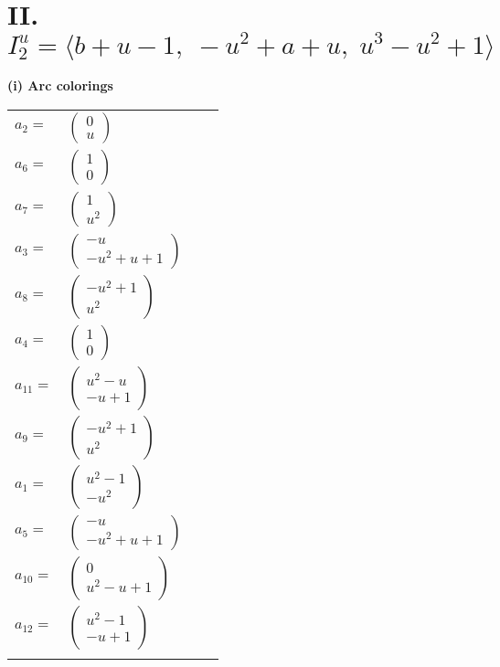 \documentclass[1p]{elsarticle_modified}
\theoremstyle{definition}
\begin{document}
\centering \section*{II. $I^u_{2}= \langle b+u-1,\;- u^2+a+u,\;u^3- u^2+1 \rangle$}
\flushleft \textbf{(i) Arc colorings}\\
\begin{tabular}{m{7pt} m{180pt} m{7pt} m{180pt} }
\flushright $a_{2}=$&$\begin{pmatrix}0\\u\end{pmatrix}$ \\
\flushright $a_{6}=$&$\begin{pmatrix}1\\0\end{pmatrix}$ \\
\flushright $a_{7}=$&$\begin{pmatrix}1\\u^2\end{pmatrix}$ \\
\flushright $a_{3}=$&$\begin{pmatrix}- u\\- u^2+u+1\end{pmatrix}$ \\
\flushright $a_{8}=$&$\begin{pmatrix}- u^2+1\\u^2\end{pmatrix}$ \\
\flushright $a_{4}=$&$\begin{pmatrix}1\\0\end{pmatrix}$ \\
\flushright $a_{11}=$&$\begin{pmatrix}u^2- u\\- u+1\end{pmatrix}$ \\
\flushright $a_{9}=$&$\begin{pmatrix}- u^2+1\\u^2\end{pmatrix}$ \\
\flushright $a_{1}=$&$\begin{pmatrix}u^2-1\\- u^2\end{pmatrix}$ \\
\flushright $a_{5}=$&$\begin{pmatrix}- u\\- u^2+u+1\end{pmatrix}$ \\
\flushright $a_{10}=$&$\begin{pmatrix}0\\u^2- u+1\end{pmatrix}$ \\
\flushright $a_{12}=$&$\begin{pmatrix}u^2-1\\- u+1\end{pmatrix}$\\&\end{tabular}
\end{document}
